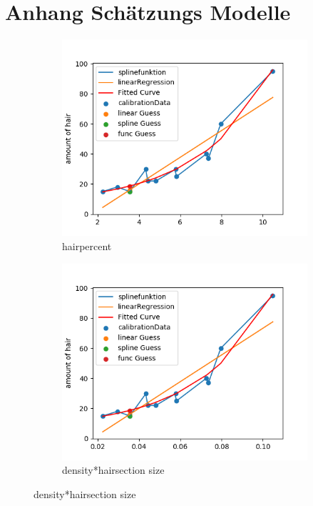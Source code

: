 \documentclass[german,a4paper, 12pt]{llncs}
\begin{document}
\section{Anhang Schätzungs Modelle}
\label{appendix:modelle}
\begin{figure}[H] %
\begin{subfigure}{0.48\textwidth}
	\includegraphics[width=1.1\linewidth]{fig64/g01_hairpercent.png}
	\caption{hairpercent} \label{fig:a}
\end{subfigure}\hspace*{\fill}
\begin{subfigure}{0.48\textwidth}
	\includegraphics[width=1.1\linewidth]{fig64/g02_densitynorm.png}
	\caption{density*hairsection size} \label{fig:b}
\end{subfigure}


\end{figure}
\end{document}
